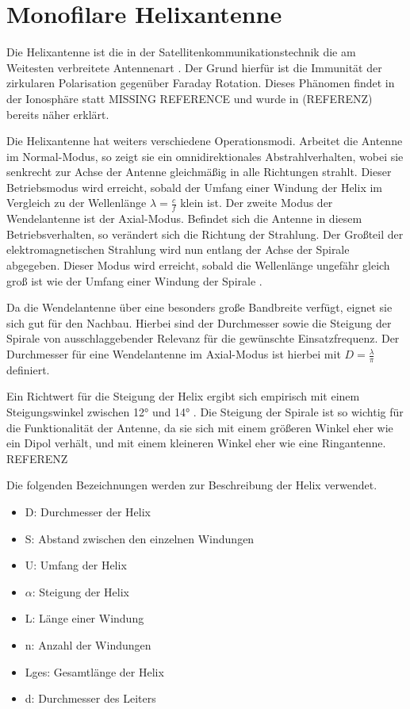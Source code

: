 \section{Monofilare Helixantenne}
Die Helixantenne ist die in der Satellitenkommunikationstechnik die am Weitesten verbreitete Antennenart \cite{HelicalAntennas}. Der Grund hierfür ist die Immunität der zirkularen Polarisation gegenüber Faraday Rotation. Dieses Phänomen findet in der Ionosphäre statt MISSING REFERENCE und wurde in (REFERENZ) bereits näher erklärt.

Die Helixantenne hat weiters verschiedene Operationsmodi. Arbeitet die Antenne im Normal-Modus, so zeigt sie ein omnidirektionales Abstrahlverhalten, wobei sie senkrecht zur Achse der Antenne gleichmäßig in alle Richtungen strahlt. Dieser Betriebsmodus wird erreicht, sobald der Umfang einer Windung der Helix im Vergleich zu der Wellenlänge $\lambda=\frac{c}{f}$ klein ist. Der zweite Modus der Wendelantenne ist der Axial-Modus. Befindet sich die Antenne in diesem Betriebsverhalten, so verändert sich die Richtung der Strahlung. Der Großteil der elektromagnetischen Strahlung wird nun entlang der Achse der Spirale abgegeben. Dieser Modus wird erreicht, sobald die Wellenlänge ungefähr gleich groß ist wie der Umfang einer Windung der Spirale \cite{HelicalAntennas}.

Da die Wendelantenne über eine besonders große Bandbreite verfügt, eignet sie sich gut für den Nachbau. Hierbei sind der Durchmesser sowie die Steigung der Spirale von ausschlaggebender Relevanz für die gewünschte Einsatzfrequenz. Der Durchmesser für eine Wendelantenne im Axial-Modus ist hierbei mit $D=\frac{\lambda}{\pi}$ definiert.

Ein Richtwert für die Steigung der Helix ergibt sich empirisch mit einem Steigungswinkel zwischen 12° und 14° \cite{helixWebsite}. Die Steigung der Spirale ist so wichtig für die Funktionalität der Antenne, da sie sich mit einem größeren Winkel eher wie ein Dipol verhält, und mit einem kleineren Winkel eher wie eine Ringantenne. REFERENZ

Die folgenden Bezeichnungen werden zur Beschreibung der Helix verwendet.
\begin{itemize}
	\item D: Durchmesser der Helix
	\item S: Abstand zwischen den einzelnen Windungen
	\item U: Umfang der Helix
	\item $\alpha$: Steigung der Helix
	\item L: Länge einer Windung
	\item n: Anzahl der Windungen
	\item Lges: Gesamtlänge der Helix
	\item d: Durchmesser des Leiters
\end{itemize}

